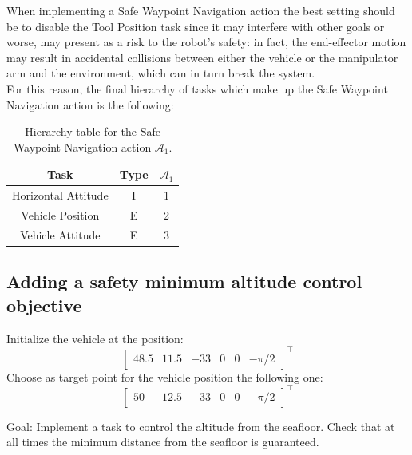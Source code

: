 \documentclass{article}
\begin{document}
When implementing a Safe Waypoint Navigation action the best setting should be to disable the Tool Position task since it may interfere with other goals or worse, may present as a risk to the robot's safety: in fact, the end-effector motion may result in accidental collisions between either the vehicle or the manipulator arm and the environment, which can in turn break the system. \\
For this reason, the final hierarchy of tasks which make up the Safe Waypoint Navigation action is the following:
\begin{table}[htb]
	\caption{Hierarchy table for the Safe Waypoint Navigation action $\mathcal{A}_{1}$.}
	\label{tb1:ex1.1.4SafeWaypointNavigationTable}
	\begin{center}
		\footnotesize
		\begin{tabular}{ccc}
			\toprule
			Task & Type & $\mathcal{A}_{1}$ \\
			\midrule
			Horizontal Attitude & I & 1 \\
			\hdashline
			Vehicle Position    & E & 2 \\
			\hdashline
			Vehicle Attitude    & E & 3 \\
			\bottomrule
		\end{tabular}
	\end{center}
\end{table}


\subsection{Adding a safety minimum altitude control objective}
Initialize the vehicle at the position:
\begin{displaymath}
\begin{bmatrix} 48.5 & 11.5 & -33 & 0 & 0 &-\pi/2\end{bmatrix}^\top
\end{displaymath}
Choose as target point for the vehicle position the following one:
\begin{displaymath}
\begin{bmatrix} 50 & -12.5 & -33 & 0 & 0 & -\pi/2 \end{bmatrix}^\top
\end{displaymath}

Goal: Implement a task to control the altitude from the seafloor. Check that at all times the minimum distance from the seafloor is guaranteed.
\end{document}
